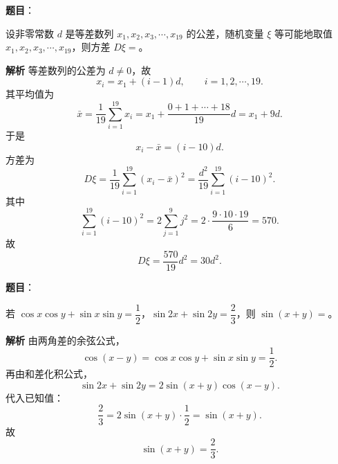 \begin{answer}

\textbf{题目}：

设非零常数 $d$ 是等差数列 $x_1,x_2,x_3,\cdots,x_{19}$ 的公差，随机变量 $\xi$ 等可能地取值 $x_1,x_2,x_3,\cdots,x_{19}$，则方差 $D\xi=$\gkblank{}。

\textbf{解析}
等差数列的公差为 $d\neq0$，故
\nopagebreak[4]
\[x_i=x_1+(i-1)d,\qquad i=1,2,\cdots,19.\]
其平均值为
\nopagebreak[4]
\[\bar x=\frac1{19}\sum_{i=1}^{19}x_i=x_1+\frac{0+1+\cdots+18}{19}d=x_1+9d.\]
于是
\nopagebreak[4]
\[x_i-\bar x=(i-10)d.\]
方差为
\nopagebreak[4]
\[D\xi=\frac1{19}\sum_{i=1}^{19}(x_i-\bar x)^2
=\frac{d^2}{19}\sum_{i=1}^{19}(i-10)^2.\]
其中
\nopagebreak[4]
\[\sum_{i=1}^{19}(i-10)^2=2\sum_{j=1}^{9}j^2
=2\cdot\frac{9\cdot10\cdot19}{6}=570.\]
故
\nopagebreak[4]
\[D\xi=\frac{570}{19}d^2=30d^2.\]


\end{answer}
\begin{answer}

\textbf{题目}：

若 $\cos x\cos y+\sin x\sin y=\dfrac12$，$\sin 2x+\sin 2y=\dfrac23$，则 $\sin(x+y)=$\gkblank{}。

\textbf{解析}
由两角差的余弦公式，
\nopagebreak[4]
\[\cos(x-y)=\cos x\cos y+\sin x\sin y=\frac12.\]
再由和差化积公式，
\nopagebreak[4]
\[\sin2x+\sin2y=2\sin(x+y)\cos(x-y).\]
代入已知值：
\nopagebreak[4]
\[\frac23=2\sin(x+y)\cdot\frac12=\sin(x+y).\]
故
\nopagebreak[4]
\[\sin(x+y)=\frac23.\]


\end{answer}
